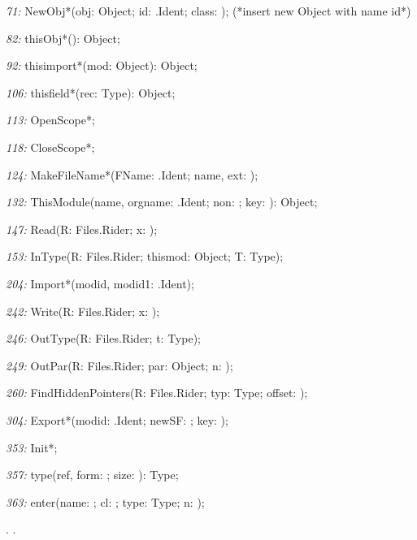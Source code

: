 \item{\it 71:} NewObj*(\VAR obj: Object; id: \ORS.Ident; class: \INTEGER);  (*insert new Object with name id*)
\item{\it 82:} thisObj*(): Object;
\item{\it 92:} thisimport*(mod: Object): Object;
\item{\it 106:} thisfield*(rec: Type): Object;
\item{\it 113:} OpenScope*;
\item{\it 118:} CloseScope*;
\item{\it 124:} MakeFileName*(\VAR FName: \ORS.Ident; name, ext: \ARRAYOF\CHAR);
\item{\it 132:} ThisModule(name, orgname: \ORS.Ident; non: \BOOLEAN; key: \LONGINT): Object;
\item{\it 147:} Read(\VAR R: Files.Rider; \VAR x: \INTEGER);
\item{\it 153:} InType(\VAR R: Files.Rider; thismod: Object; \VAR T: Type);
\item{\it 204:} Import*(\VAR modid, modid1: \ORS.Ident);
\item{\it 242:} Write(\VAR R: Files.Rider; x: \INTEGER);
\item{\it 246:} OutType(\VAR R: Files.Rider; t: Type);
\item{\it 249:} OutPar(\VAR R: Files.Rider; par: Object; n: \INTEGER);
\item{\it 260:} FindHiddenPointers(\VAR R: Files.Rider; typ: Type; offset: \LONGINT);
\item{\it 304:} Export*(\VAR modid: \ORS.Ident; \VAR newSF: \BOOLEAN; \VAR key: \LONGINT);
\item{\it 353:} Init*;
\item{\it 357:} type(ref, form: \INTEGER; size: \LONGINT): Type;
\item{\it 363:} enter(name: \ARRAYOF\CHAR; cl: \INTEGER; type: Type; n: \LONGINT);

. \ORG.

